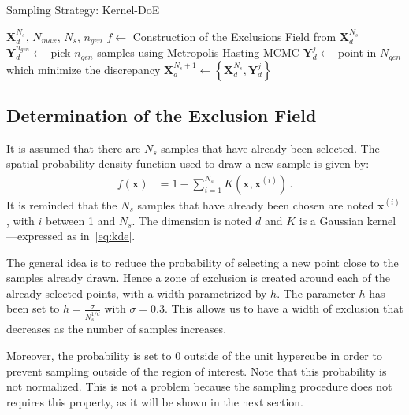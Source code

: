 \begin{algorithm}
  \caption{Sampling Strategy: Kernel-DoE}
  \label{alg:doe}
  \begin{algorithmic}[1]
  \Require $\mathbf{X}^{N_s}_d$, $N_{max}$, $N_s$, $n_{gen}$
    \State $f \gets$ Construction of the Exclusions Field from $\mathbf{X}^{N_s}_d$
    \State $\mathbf{Y}^{n_{gen}}_d \gets$ pick $n_{gen}$ samples using Metropolis-Hasting MCMC
    \State $\mathbf{Y}^{j}_d \gets$ point in $N_{gen}$ which minimize the discrepancy
	\State $\mathbf{X}^{N_s + 1}_d \gets \left\{\mathbf{X}^{N_s}_d, \mathbf{Y}^{j}_d \right\}$
  \EndWhile
  \end{algorithmic}
\end{algorithm}




\subsection{Determination of the Exclusion Field}\label{sec:kde}

It is assumed that there are $N_s$ samples that have already been selected. The spatial probability density function used to draw a new sample is given by:
\begin{align}
f(\mathbf{x}) &= 1 - \sum_{i=1}^{N_{s}} K\left(\mathbf{x},\mathbf{x}^{(i)}\right) \, .
\end{align}
It is reminded that the $N_s$ samples that have already been chosen are noted $\mathbf{x}^{(i)}$, with $i$ between 1 and $N_s$. The dimension is noted $d$ and $K$ is a Gaussian kernel---expressed as in~\cref{eq:kde}.

The general idea is to reduce the probability of selecting a new point close to the samples already drawn. Hence a zone of exclusion is created around each of the already selected points, with a width parametrized by $h$. The parameter $h$ has been set to $h = \frac{\sigma}{N_s^{1/d}}$ with $\sigma=0.3$. This allows us to have a width of exclusion that decreases as the number of samples increases.

Moreover, the probability is set to 0 outside of the unit hypercube in order to prevent sampling outside of the region of interest. Note that this probability is not normalized. This is not a problem because the sampling procedure does not requires this property, as it will be shown in the next section.


